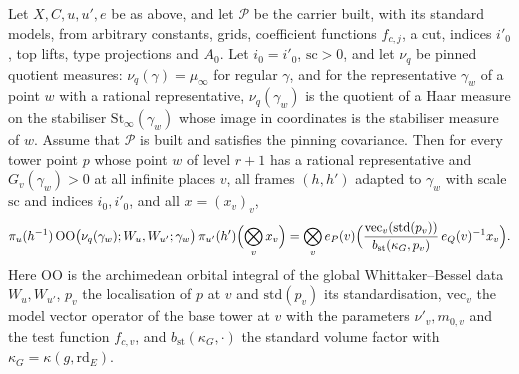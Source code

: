 \begin{theorem}\label{pf:thmS:jointtensor}
Let $X,C,u,u',e$ be as above, and let $\mathcal P$ be the carrier built, with its standard models, from arbitrary constants,
grids, coefficient functions $f_{c,j}$, a cut, indices $i'_0$, top lifts, type projections and $A_0$. Let $i_0=i'_0$,
$\mathrm{sc}>0$, and let $\nu_q$ be pinned quotient measures: $\nu_q(\gamma)=\mu_\infty$ for regular $\gamma$, and for the
representative $\gamma_w$ of a point $w$ with a rational representative, $\nu_q(\gamma_w)$ is the quotient of a Haar measure on the
stabiliser $\mathrm{St}_\infty(\gamma_w)$ whose image in coordinates is the stabiliser measure of $w$. Assume that $\mathcal P$ is
built and satisfies the pinning covariance. Then for every tower point $p$ whose point $w$ of level $r+1$ has a rational
representative and $G_v(\gamma_w)>0$ at all infinite places $v$, all frames $(h,h')$ adapted to $\gamma_w$ with scale
$\mathrm{sc}$ and indices $i_0,i'_0$, and all $x=(x_v)_v$,
\[
\pi_u(h^{-1})\,\mathrm{OO}\bigl(\nu_q(\gamma_w);W_u,W_{u'};\gamma_w\bigr)\,\pi_{u'}(h')\Bigl(\bigotimes_vx_v\Bigr)
=\bigotimes_ve_P(v)\Bigl(\frac{\mathrm{vec}_v(\mathrm{std}(p_v))}{b_{\mathrm{st}}(\kappa_G,p_v)}\,e_Q(v)^{-1}x_v\Bigr).
\]
Here $\mathrm{OO}$ is the archimedean orbital integral of the global Whittaker--Bessel data $W_u,W_{u'}$, $p_v$ the localisation
of $p$ at $v$ and $\mathrm{std}(p_v)$ its standardisation, $\mathrm{vec}_v$ the model vector operator of the base tower at $v$ with
the parameters $\nu'_v,m_{0,v}$ and the test function $f_{c,v}$, and $b_{\mathrm{st}}(\kappa_G,\cdot)$ the standard volume factor
with $\kappa_G=\kappa(g,\mathrm{rd}_E)$.
\end{theorem}

